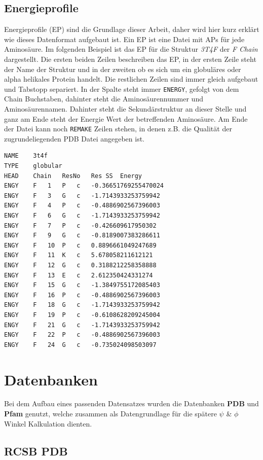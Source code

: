 \subsection{Energieprofile}
\label{sec:Energieprofil}
Energieprofile (EP) sind die Grundlage dieser Arbeit, daher wird hier kurz erklärt wie dieses Datenformat aufgebaut ist. Ein EP ist eine Datei mit APs für jede Aminosäure. Im folgenden Beispiel ist das EP für die Struktur \emph{3T4F} der \emph{F Chain} dargestellt. Die ersten beiden Zeilen beschreiben das EP, in der ersten Zeile steht der Name der Struktur und in der zweiten ob es sich um ein globuläres oder alpha helikales Protein handelt. Die restlichen Zeilen sind immer gleich aufgebaut und Tabstopp separiert. In der Spalte steht immer \texttt{ENERGY}, gefolgt von dem Chain Buchstaben, dahinter steht die Aminosäurennummer und Aminosäurennamen. Dahinter steht die Sekundärstruktur an dieser Stelle und ganz am Ende steht der Energie Wert der betreffenden Aminosäure. Am Ende der Datei kann noch \texttt{REMAKE} Zeilen stehen, in denen z.B. die Qualität der zugrundeliegenden PDB Datei angegeben ist.

\begin{lstlisting}
NAME	3t4f
TYPE	globular
HEAD	Chain	ResNo	Res	SS	Energy
ENGY	F	1	P	c	-0.36651769255470024
ENGY	F	3	G	c	-1.7143933253759942
ENGY	F	4	P	c	-0.4886902567396003
ENGY	F	6	G	c	-1.7143933253759942
ENGY	F	7	P	c	-0.426609617950302
ENGY	F	9	G	c	-0.8189007383286611
ENGY	F	10	P	c	0.8896661049247689
ENGY	F	11	K	c	5.678058211612121
ENGY	F	12	G	c	0.3188212258358888
ENGY	F	13	E	c	2.612350424331274
ENGY	F	15	G	c	-1.3849755172085403
ENGY	F	16	P	c	-0.4886902567396003
ENGY	F	18	G	c	-1.7143933253759942
ENGY	F	19	P	c	-0.6108628209245004
ENGY	F	21	G	c	-1.7143933253759942
ENGY	F	22	P	c	-0.4886902567396003
ENGY	F	24	G	c	-0.735024098503097
\end{lstlisting}


\section{Datenbanken}
Bei dem Aufbau eines passenden Datensatzes wurden die Datenbanken \textbf{PDB} und \textbf{Pfam} genutzt, welche zusammen als Datengrundlage für die spätere $\psi$ \& $\phi$ Winkel Kalkulation dienten. 


\subsection{RCSB PDB}

